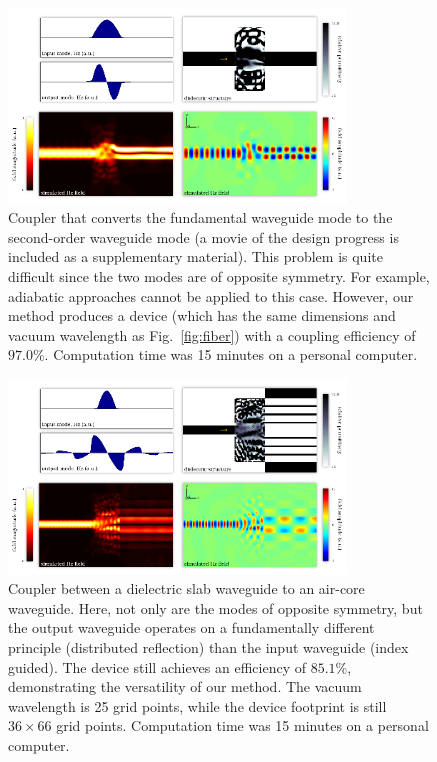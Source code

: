 \documentclass[letterpaper,10pt]{article}
\begin{document}
\begin{figure}[htbp]
    \centering
    \includegraphics[width=0.8\textwidth]{2} 
    \caption{Coupler that converts the fundamental waveguide mode to the
            second-order waveguide mode
            (a movie of the design progress is included as a
            supplementary material).
        This problem is quite difficult since the two modes are of 
            opposite symmetry.
        For example, adiabatic approaches cannot be applied to this case.
        However, our method produces a device 
            (which has the same dimensions and vacuum wavelength as 
            Fig.~\ref{fig:fiber})  
            with a coupling efficiency of $97.0\%$. 
        Computation time was 15 minutes on a personal computer.
        }
    \label{fig:mode}
\end{figure}
\begin{figure}[htbp]
    \centering
    \includegraphics[width=0.8\textwidth]{3}
    \caption{Coupler between a dielectric slab waveguide to 
            an air-core waveguide.
        Here, not only are the modes of opposite symmetry,
            but the output waveguide operates on a fundamentally different
            principle (distributed reflection) than the input waveguide 
            (index guided).
        The device still achieves an efficiency of $85.1\%$, demonstrating the
            versatility of our method.
        The vacuum wavelength is 25 grid points, 
            while the device footprint is still $36 \times 66$ grid points.
        Computation time was 15 minutes on a personal computer.
        }
        \label{fig:aircore}
\end{figure}
\end{document}
